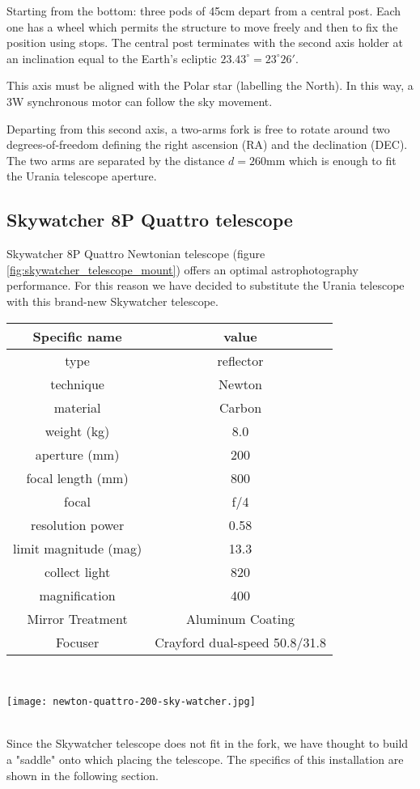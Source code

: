 Starting from the bottom: three pods of 45cm depart from a central post. Each one has a wheel which permits the structure to move freely and then to fix the position using stops.
The central post terminates with the second axis holder at an inclination equal to the Earth's ecliptic \(23.43^{\circ} = 23^{\circ} 26'\).

This axis must be aligned with the Polar star (labelling the North).
In this way, a 3W synchronous motor can follow the sky movement.

Departing from this second axis, a two-arms fork is free to rotate around two degrees-of-freedom defining the right ascension (RA) and the declination (DEC).
The two arms are separated by the distance \(d = 260\)mm which is enough to fit the Urania telescope aperture.
\subsection{Skywatcher 8P Quattro telescope}
Skywatcher 8P Quattro Newtonian telescope (figure \ref{fig:skywatcher_telescope_mount}) offers an optimal astrophotography performance.
For this reason we have decided to substitute the Urania telescope with this brand-new Skywatcher telescope.
\\
\begin{minipage}{0.5\textwidth}
    \centering
    \begin{tabular}{c|c}
        Specific name & value \\
        \hline
        type & reflector \\
        technique & Newton  \\
        material & Carbon  \\
        weight (kg) & 8.0 \\
        aperture (mm) & 200 \\
        focal length (mm) & 800 \\
        focal & f/4 \\
        resolution power & 0.58 \\
        limit magnitude (mag) & 13.3 \\
        collect light & 820 \\
        magnification & 400 \\
        Mirror Treatment & Aluminum Coating \\
        Focuser & Crayford dual-speed 50.8/31.8 \\
        \hline
    \end{tabular}
    \label{tab_skywatcher_quattro}
\end{minipage}
\\
\begin{minipage}{0.5\textwidth}
    \centering
    \texttt{[image: newton-quattro-200-sky-watcher.jpg]}
    \label{fig:skywatcher_telescope_mount}
\end{minipage}
\\
Since the Skywatcher telescope does not fit in the fork, we have thought to build a "saddle" onto which placing the telescope.
The specifics of this installation are shown in the following section.

